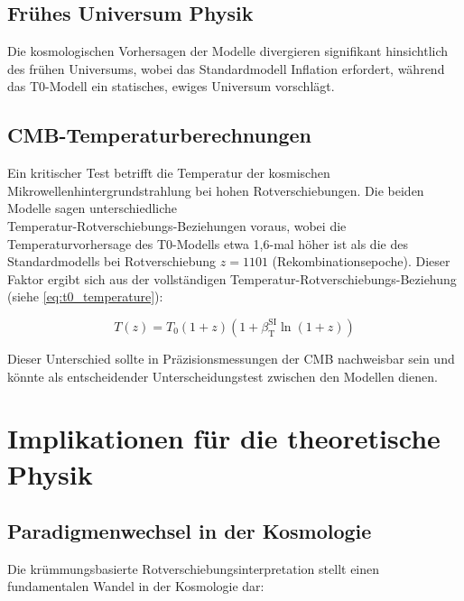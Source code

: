 \documentclass[12pt,a4paper]{article}
\newcommand{\betaT}{\beta_{\text{T}}}
\begin{document}
	\subsection{Frühes Universum Physik}
	\label{subsec:early_universe_tests}
	
	Die kosmologischen Vorhersagen der Modelle divergieren signifikant hinsichtlich des frühen Universums, wobei das Standardmodell Inflation\cite{guth1981} erfordert, während das T0-Modell ein statisches, ewiges Universum vorschlägt\cite{pascher_part2_2025}.
	
	\subsection{CMB-Temperaturberechnungen}
	\label{subsec:cmb_tests}
	
	Ein kritischer Test betrifft die Temperatur der kosmischen Mikrowellenhintergrundstrahlung bei hohen Rotverschiebungen\cite{fixsen2009}. Die beiden Modelle sagen unterschiedliche \\Temperatur-Rotverschiebungs-Beziehungen voraus\cite{pascher_temp_2025}, wobei die Temperaturvorhersage des T0-Modells etwa 1,6-mal höher ist als die des Standardmodells bei Rotverschiebung $z = 1101$ (Rekombinationsepoche). Dieser Faktor ergibt sich aus der vollständigen Temperatur-Rotverschiebungs-Beziehung (siehe \cref{eq:t0_temperature}):
	
	\begin{equation}
		\label{eq:detailed_temp}
		T(z) = T_0 (1+z)(1 + \betaT^{\text{SI}} \ln(1+z))
	\end{equation}
	
	Dieser Unterschied sollte in Präzisionsmessungen der CMB nachweisbar sein und könnte als entscheidender Unterscheidungstest zwischen den Modellen dienen\cite{pascher_temp_2025}.
	
	\section{Implikationen für die theoretische Physik}
	\label{sec:implications}
	
	\subsection{Paradigmenwechsel in der Kosmologie}
	\label{subsec:paradigm_shift}
	
	Die krümmungsbasierte Rotverschiebungsinterpretation stellt einen fundamentalen Wandel in der Kosmologie dar\cite{pascher_vereinheitlichung_2025}:
	
\end{document}
